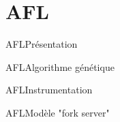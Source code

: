 \section{AFL}

\begin{frame}{AFL}{Présentation}
\end{frame}

\begin{frame}{AFL}{Algorithme génétique}
\end{frame}

\begin{frame}{AFL}{Instrumentation}
\end{frame}

\begin{frame}{AFL}{Modèle "fork server"}
\end{frame}
